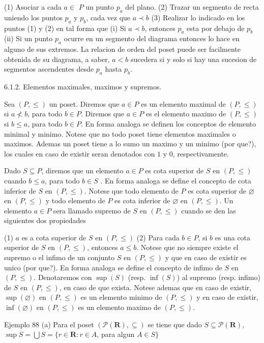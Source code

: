 (1) Asociar a cada \(a\in \) \(P\) un punto \(p_{a}\) del plano.
(2) Trazar un segmento de recta uniendo los puntos \(p_{a}\) y \(p_{b}\), cada vez que \(a\prec b\)
(3) Realizar lo indicado en los puntos (1) y (2) en tal forma que
(i) Si \(a\prec b\), entonces \(p_{a}\) esta por debajo de \(p_{b}\)
(ii) Si un punto \(p_{a}\) ocurre en un segmento del diagrama entonces lo hace en alguno de sus extremos.
La relacion de orden del poset puede ser facilmente obtenida de su diagrama, a saber, \(a< b\) sucedera si y solo si hay una sucesion de segmentos ascendentes desde \(p_{a}\) hasta \(p_{b}\).

6.1.2. Elementos maximales, maximos y supremos.

Sea \((P,\leq )\) un poset. Diremos que \(a\in P\) es un elemento maximal de \((P,\leq )\) si \(a\nless b\), para todo \(b\in P\). Diremos que \( a\in P\) es el elemento maximo de \((P,\leq )\) si \(b\leq a\), para todo \(b\in P\). En forma analoga se definen los conceptos de elemento minimal y minimo. Notese que no todo poset tiene elementos maximales o maximos. Ademas un poset tiene a lo sumo un maximo y un minimo (por que?), los cuales en caso de existir seran denotados con \(1\) y \(0\), respectivamente.

Dado \(S\subseteq P\), diremos que un elemento \(a\in P\) es cota superior de \(S\) en \((P,\leq )\) cuando \(b\leq a\), para todo \(b\in S\) . En forma analoga se define el concepto de cota inferior de \(S\) en \((P,\leq )\). Notese que todo elemento de \(P\) es cota superior de \(\varnothing \) en \((P,\leq )\) y todo elemento de \(P\) es cota inferior de \(\varnothing \) en \((P,\leq )\). Un elemento \(a\in P\) sera llamado supremo de \(S\) en \((P,\leq )\) cuando se den las siguientes dos propiedades

(1) \(a\) es a cota superior de \(S\) en \((P,\leq )\)
(2) Para cada \(b\in P\), si \(b\) es una cota superior de \(S\) en \( (P,\leq )\), entonces \(a\leq b\).
Notese que no siempre existe el supremo o el infimo de un conjunto \(S\) en \((P,\leq )\) y que en caso de existir es unico (por que?). En forma analoga se define el concepto de infimo de \(S\) en \((P,\leq )\). Denotaremos con \(\sup (S)\) (resp. \(\inf (S)\)) al supremo (resp. infimo) de \(S\) en \((P,\leq )\), en caso de que exista. Notese ademas que en caso de existir, \(\sup (\varnothing )\) en \((P,\leq )\) es un elemento minimo de \( (P,\leq )\) y en caso de existir, \(\inf (\varnothing )\) en \((P,\leq )\) es un elemento maximo de \((P,\leq )\).

Ejemplo 88 (a) Para el poset \((\mathcal{P}(\mathbf{R}),\subseteq )\) se tiene que dado \( S\subseteq \mathcal{P}(\mathbf{R}),\)
\(\sup S=\bigcup S=\{r\in \mathbf{R}:r\in A\), para algun \(A\in S\}\)


